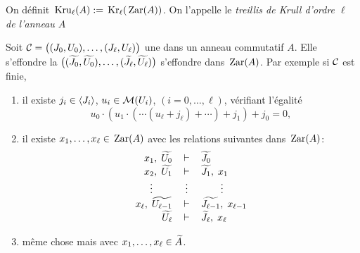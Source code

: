 \begin{definition}{\rm 
\label{defKruA}
On définit $\,{\rm Kru}_\ell(A):=\,{\rm Kr}_\ell(\,{\rm Zar}(A))$. On l'appelle
le {\em treillis de Krull d'ordre $\ell$ de l'anneau $A$}
}
\end{definition}


\begin{theorem}
\label{corCollaps} Soit ${\cal C}=\big((J_0,U_0),\ldots,(J_\ell,U_\ell)\big)$  une
\proc dans un anneau commutatif $A$.
Elle s'effondre \ssi la \proc
$\big((\widetilde{J_0},\widetilde{U_0}),\ldots,
(\widetilde{J_\ell},\widetilde{U_\ell})\big)$  s'effondre dans
$\,{\rm Zar}(A)$. Par exemple si ${\cal C}$ est finie, \propeq
\begin{enumerate}
\item  il existe $j_i\in \left\langle{J_i}\right\rangle$, $u_i\in{\cal M}(U_i)$,
$(i=0,\ldots,\ell)$,
vérifiant l'égalité
$$u_0\cdot(u_1\cdot(\cdots(u_\ell+j_\ell)+\cdots)+j_1)+j_0=0,
$$
\item  il existe $x_1,\ldots,x_\ell\in \,{\rm Zar}(A)$ avec les relations
suivantes
dans $\,{\rm Zar}(A)$:
$$\begin{array}{rcl}
 x_1,\; \widetilde{U_0}& \,\vdash\,  &  \widetilde{J_0}
\\
 x_2,\; \widetilde{U_1}& \,\vdash\,  &  \widetilde{J_1} ,\;  x_1
\\
\vdots\qquad & \vdots  & \qquad\vdots
\\
x_\ell,\; \widetilde{U_{\ell-1}}&\,\vdash\,& \widetilde{J_{\ell-1}},\;x_{\ell-1}
\\
\widetilde{U_\ell}& \,\vdash\, & \widetilde{J_\ell} ,\; x_\ell
\end{array}$$
\item  même chose mais avec $x_1,\ldots,x_\ell\in \widetilde{A}$.
\end{enumerate}
\end{theorem}
